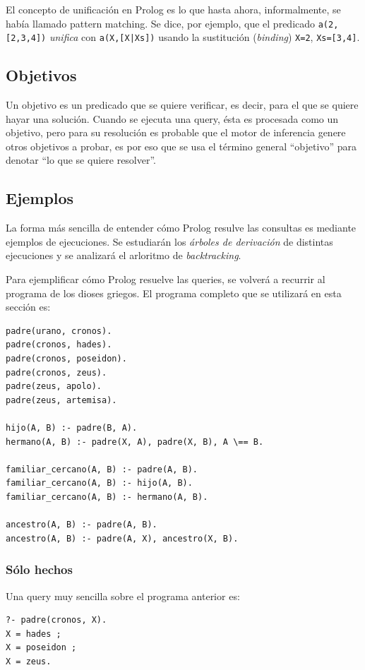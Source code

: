 \documentclass[12pt,titlepage]{article}
\begin{document}
El concepto de unificación en Prolog es lo que hasta ahora, informalmente, se había llamado pattern matching. Se dice, por ejemplo, que el predicado \lstinline$a(2, [2,3,4])$ \emph{unifica} con \lstinline$a(X,[X|Xs])$ usando la sustitución (\emph{binding}) \lstinline|X=2|, \lstinline|Xs=[3,4]|.

\subsection{Objetivos}

Un objetivo es un predicado que se quiere verificar, es decir, para el que se quiere hayar una solución. Cuando se ejecuta una query, ésta es procesada como un objetivo, pero para su resolución es probable que el motor de inferencia genere otros objetivos a probar, es por eso que se usa el término general ``objetivo'' para denotar ``lo que se quiere resolver''.

\subsection{Ejemplos}

La forma más sencilla de entender cómo Prolog resulve las consultas es mediante ejemplos de ejecuciones. Se estudiarán los \emph{árboles de derivación} de distintas ejecuciones y se analizará el arloritmo de \emph{backtracking}.

Para ejemplificar cómo Prolog resuelve las queries, se volverá a recurrir al programa de los dioses griegos. El programa completo que se utilizará en esta sección es:
\begin{lstlisting}
padre(urano, cronos).
padre(cronos, hades).
padre(cronos, poseidon).
padre(cronos, zeus).
padre(zeus, apolo).
padre(zeus, artemisa).

hijo(A, B) :- padre(B, A).
hermano(A, B) :- padre(X, A), padre(X, B), A \== B.

familiar_cercano(A, B) :- padre(A, B).
familiar_cercano(A, B) :- hijo(A, B).
familiar_cercano(A, B) :- hermano(A, B).

ancestro(A, B) :- padre(A, B).
ancestro(A, B) :- padre(A, X), ancestro(X, B).
\end{lstlisting}

\subsubsection{Sólo hechos}

Una query muy sencilla sobre el programa anterior es:
\begin{lstlisting}
?- padre(cronos, X).
X = hades ;
X = poseidon ;
X = zeus.
\end{lstlisting}
\end{document}
